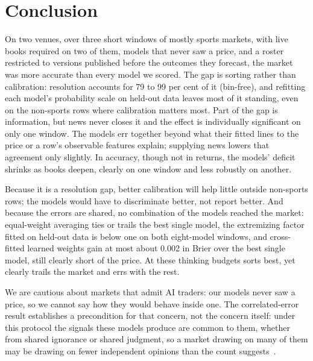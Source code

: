 \section{Conclusion}
\label{sec:conclusion}

On two venues, over three short windows of mostly sports markets, with live
books required on two of them, models that never saw a price, and a roster
restricted to versions published before the outcomes they forecast, the market was more accurate than every model we
scored. The gap is sorting rather than calibration: resolution accounts for 79 to 99
per cent of it (bin-free), and refitting each model's probability scale on held-out data
leaves most of it standing, even on the non-sports rows where calibration
matters most. Part of the gap is information, but news never closes it and the
effect is individually significant on only one window. The models err together beyond what their fitted lines to the price or a row's observable features explain; supplying news lowers that agreement only slightly. In
accuracy, though not in returns, the models' deficit shrinks as books deepen,
clearly on one window and less robustly on another.

Because it is a resolution gap, better calibration will help little outside non-sports
rows; the models would have to discriminate better, not report better. And
because the errors are shared, no combination of the models reached the market: equal-weight averaging ties or trails
the best single model, the extremizing factor fitted on held-out data is below
one on both eight-model windows, and cross-fitted learned weights gain at most about 0.002 in Brier over the best single model, still clearly short of the price. At these thinking budgets \mGptFiveFive sorts best, yet clearly trails the market and errs with the rest.

We are cautious about markets that admit AI traders: our models never saw a
price, so we cannot say how they would behave inside one. The correlated-error
result establishes a precondition for that concern, not the concern itself: under
this protocol the signals these models produce are common to them, whether from
shared ignorance or shared judgment, so a market drawing on many of them may be
drawing on fewer independent opinions than the count
suggests~\citep{kleinberg2021}.
